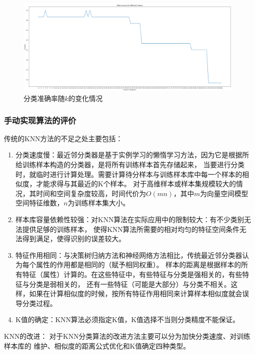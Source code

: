 \documentclass[12pt]{article}
\begin{document}
\begin{figure}[htbp]
  \centering
  \includegraphics[scale=0.28]{figures/knn/accuracy2.png}
  \caption{分类准确率随$k$的变化情况}
  \label{fig:accuracy2}
\end{figure}


\subsubsection{手动实现算法的评价}
传统的KNN方法的不足之处主要包括：
\begin{enumerate}
  \item 分类速度慢：最近邻分类器是基于实例学习的懒惰学习方法，因为它是根据所给训练样本构造的分类器，是将所有训练样本首先存储起来，
        当要进行分类时，就临时进行计算处理。需要计算待分样本与训练样本库中每一个样本的相似度，才能求得与其最近的K个样本。
        对于高维样本或样本集规模较大的情况，其时间和空间复杂度较高，时间代价为$O(mn)$，其中$m$为向量空间模型空间特征维数，$n$为训练样本集大小。
  \item 样本库容量依赖性较强：对KNN算法在实际应用中的限制较大：有不少类别无法提供足够的训练样本，
        使得KNN算法所需要的相对均匀的特征空间条件无法得到满足，使得识别的误差较大。
  \item 特征作用相同：与决策树归纳方法和神经网络方法相比，传统最近邻分类器认为每个属性的作用都是相同的（赋予相同权重）。
        样本的距离是根据样本的所有特征（属性）计算的。在这些特征中，有些特征与分类是强相关的，有些特征与分类是弱相关的，
        还有一些特征（可能是大部分）与分类不相关。这样，如果在计算相似度的时候，按所有特征作用相同来计算样本相似度就会误导分类过程。
  \item K值的确定：KNN算法必须指定K值，K值选择不当则分类精度不能保证。
\end{enumerate}

KNN的改进：
对于KNN分类算法的改进方法主要可以分为加快分类速度、对训练样本库的 维护、相似度的距离公式优化和K值确定四种类型。
\end{document}
